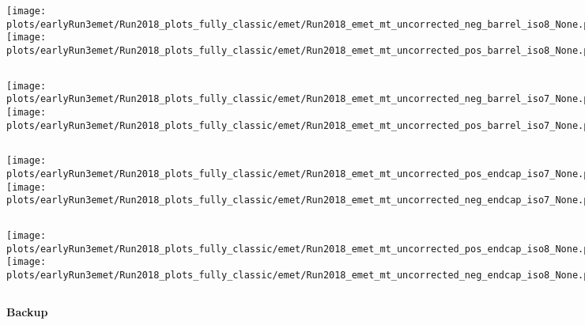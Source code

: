 \documentclass[en,16:9,navbarinfooter]{presentation/sdqbeamer}
\begin{document}
\begin{frame}{\insertsubsection}
   \begin{columns}
   \texttt{[image: plots/earlyRun3emet/Run2018\_plots\_fully\_classic/emet/Run2018\_emet\_mt\_uncorrected\_neg\_barrel\_iso8\_None.png]}
   \texttt{[image: plots/earlyRun3emet/Run2018\_plots\_fully\_classic/emet/Run2018\_emet\_mt\_uncorrected\_pos\_barrel\_iso8\_None.png]}
\end{columns}
\end{frame}

\begin{frame}{\insertsubsection}
   \begin{columns}
   \texttt{[image: plots/earlyRun3emet/Run2018\_plots\_fully\_classic/emet/Run2018\_emet\_mt\_uncorrected\_neg\_barrel\_iso7\_None.png]}
   \texttt{[image: plots/earlyRun3emet/Run2018\_plots\_fully\_classic/emet/Run2018\_emet\_mt\_uncorrected\_pos\_barrel\_iso7\_None.png]}
\end{columns}
\end{frame}

\begin{frame}{\insertsubsection}
   \begin{columns}
   \texttt{[image: plots/earlyRun3emet/Run2018\_plots\_fully\_classic/emet/Run2018\_emet\_mt\_uncorrected\_pos\_endcap\_iso7\_None.png]}
   \texttt{[image: plots/earlyRun3emet/Run2018\_plots\_fully\_classic/emet/Run2018\_emet\_mt\_uncorrected\_neg\_endcap\_iso7\_None.png]}
\end{columns}
\end{frame}

\begin{frame}{\insertsubsection}
   \begin{columns}
   \texttt{[image: plots/earlyRun3emet/Run2018\_plots\_fully\_classic/emet/Run2018\_emet\_mt\_uncorrected\_pos\_endcap\_iso8\_None.png]}
   \texttt{[image: plots/earlyRun3emet/Run2018\_plots\_fully\_classic/emet/Run2018\_emet\_mt\_uncorrected\_neg\_endcap\_iso8\_None.png]}
\end{columns}
\end{frame}

\appendix
\beginbackup
\begin{frame}
\centering
\vspace{1cm}
\LARGE{\textbf{Backup}}
\end{frame}

\backupend
\end{document}
